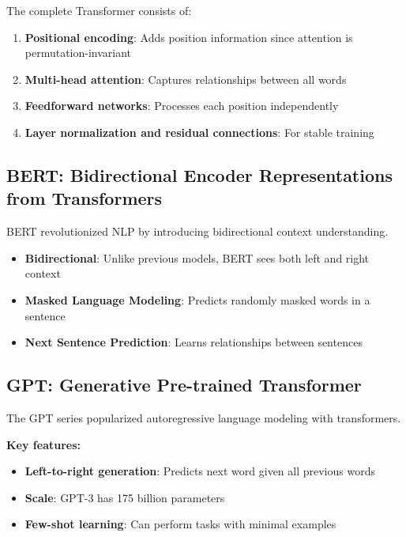 \documentclass[11pt,a4paper]{article}
\theoremstyle{definition}
\theoremstyle{plain}
\theoremstyle{remark}
\begin{document}
The complete Transformer consists of:

\begin{enumerate}
    \item \textbf{Positional encoding}: Adds position information since attention is permutation-invariant
    \item \textbf{Multi-head attention}: Captures relationships between all words
    \item \textbf{Feedforward networks}: Processes each position independently
    \item \textbf{Layer normalization and residual connections}: For stable training
\end{enumerate}

\subsection{BERT: Bidirectional Encoder Representations from Transformers}

BERT revolutionized NLP by introducing bidirectional context understanding.

\begin{tcolorbox}[colback=teal!5!white,colframe=teal!75!black,title=\textbf{BERT Key Innovations}]
\begin{itemize}
    \item \textbf{Bidirectional}: Unlike previous models, BERT sees both left and right context
    \item \textbf{Masked Language Modeling}: Predicts randomly masked words in a sentence
    \item \textbf{Next Sentence Prediction}: Learns relationships between sentences
\end{itemize}
\end{tcolorbox}

\subsection{GPT: Generative Pre-trained Transformer}

The GPT series popularized autoregressive language modeling with transformers.

\textbf{Key features:}
\begin{itemize}
    \item \textbf{Left-to-right generation}: Predicts next word given all previous words
    \item \textbf{Scale}: GPT-3 has 175 billion parameters
    \item \textbf{Few-shot learning}: Can perform tasks with minimal examples
\end{itemize}
\end{document}
